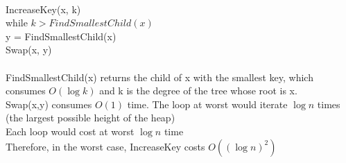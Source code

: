 \begin{problem}{3} ~\\
IncreaseKey(x, k)\\
while $k > FindSmallestChild(x)$ \\
\tab y = FindSmallestChild(x) \\
\tab Swap(x, y)\\
\\
FindSmallestChild(x) returns the child of x with the smallest key, which consumes $O(\log{k})$ and k is the degree of the tree whose root is x.\\
Swap(x,y) consumes $O(1)$ time.
The loop at worst would iterate $\log{n}$ times (the largest possible height of the heap)\\
Each loop would cost at worst $\log{n}$ time\\
Therefore, in the worst case, IncreaseKey costs $O((\log{n}) ^ 2)$
\end{problem}